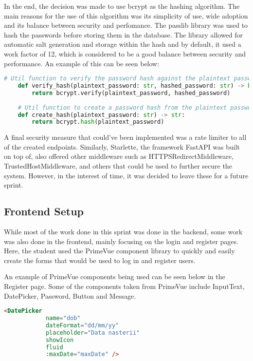 In the end, the decision was made to use bcrypt as the hashing algorithm. The main reasons for the use of this algorithm was its simplicity of use, wide adoption and its balance between security and perfomance. The passlib library was used to hash the passwords before storing them in the database. The library allowed for automatic salt generation and storage within the hash and by default, it used a work factor of 12, which is considered to be a good balance between security and performance. An example of this can be seen below:

\begin{lstlisting}[language=Python, caption=Hashing passwords with bcrypt]
    # Util function to verify the password hash against the plaintext password
    def verify_hash(plaintext_password: str, hashed_password: str) -> bool:
        return bcrypt.verify(plaintext_password, hashed_password)
    
    # Util function to create a password hash from the plaintext password
    def create_hash(plaintext_password: str) -> str:
        return bcrypt.hash(plaintext_password)
\end{lstlisting}

A final security measure that could've been implemented was a rate limiter to all of the created endpoints. Similarly, Starlette, the framework FastAPI was built on top of, also offered other middleware such as HTTPSRedirectMiddleware, TrustedHostMiddleware, and others that could be used to further secure the system. However, in the interest of time, it was decided to leave these for a future sprint.

\subsection{Frontend Setup}

While most of the work done in this sprint was done in the backend, some work was also done in the frontend, mainly focusing on the login and register pages. Here, the student used the PrimeVue component library to quickly and easily create the forms that would be used to log in and register users.

An example of PrimeVue components being used can be seen below in the Register page. Some of the components taken from PrimeVue include InputText, DatePicker, Password, Button and Message. 

\begin{lstlisting}[language=HTML, caption=PrimeVue components in the Register page]
          <DatePicker
            name="dob"
            dateFormat="dd/mm/yy"
            placeholder="Data nasterii"
            showIcon
            fluid
            :maxDate="maxDate" />
\end{lstlisting}

